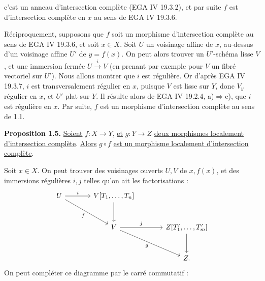 
c'est un anneau d'intersection complète (EGA IV 19.3.2), et par suite $f$ est d'intersection complète en $x$ au sens de EGA IV 19.3.6.

Réciproquement, supposons que $f$ soit un morphisme d'intersection complète au sens de EGA IV 19.3.6, et soit $x\in X$. Soit $U$ un voisinage affine de $x$, au-dessus d'un voisinage affine $U'$ de $y=f(x)$. On peut alors trouver un $U'$-schéma lisse $V$, et une immersion fermée $U\xrightarrow{i}V$ (en prenant par exemple pour $V$ un fibré vectoriel sur $U'$). Nous allons montrer que $i$ est régulière. Or d'après EGA IV 19.3.7, $i$ est transversalement régulier en $x$, puisque $V$ est lisse sur $Y$, donc $V_y$ régulier en $x$, et $U'$ plat sur $Y$. Il résulte alors de EGA IV 19.2.4, a)$\Rightarrow$c), que $i$ est régulière en $x$. Par suite, $f$ est un morphisme d'intersection complète au sens de 1.1.

\textbf{Proposition 1.5.} \uline{Soient} $f:X\to Y$, \uline{et} $g:Y\to Z$ \uline{deux morphismes localement d'intersection complète}. \uline{Alors} $g\circ f$ \uline{est un morphisme localement d'intersection complète}.

Soit $x\in X$. On peut trouver des voisinages ouverts $U,V$ de $x,f(x)$, et des immersions régulières $i,j$ telles qu'on ait les factorisations :
\[
\begin{tikzcd}[column sep=large,row sep=large]
U \arrow[r,"i"] \arrow[dr,"f"'] & V[T_1,\ldots,T_n] \arrow[d] &\\
& V \arrow[r,"j"] \arrow[dr,"g"'] & Z[T'_1,\ldots,T'_m] \arrow[d]\\
& & Z .
\end{tikzcd}
\]
On peut compléter ce diagramme par le carré commutatif :
